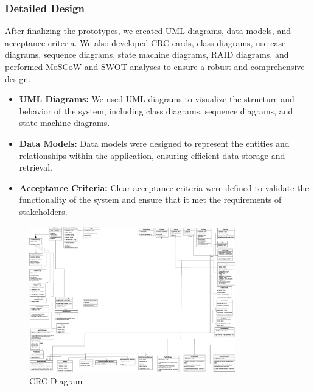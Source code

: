 \subsubsection{Detailed Design}
After finalizing the prototypes, we created UML diagrams, data models, and acceptance criteria. We also developed CRC cards, class diagrams, use case diagrams, sequence diagrams, state machine diagrams, RAID diagrams, and performed MoSCoW and SWOT analyses to ensure a robust and comprehensive design.

\begin{itemize}
  \item \textbf{UML Diagrams:} We used UML diagrams to visualize the structure and behavior of the system, including class diagrams, sequence diagrams, and state machine diagrams.
  
  \item \textbf{Data Models:} Data models were designed to represent the entities and relationships within the application, ensuring efficient data storage and retrieval.
  
  \item \textbf{Acceptance Criteria:} Clear acceptance criteria were defined to validate the functionality of the system and ensure that it met the requirements of stakeholders.
\end{itemize}

\begin{figure}[H]
    \centering
    \includegraphics[width=0.8\textwidth]{images/crc.png}
    \caption{CRC Diagram}
    \label{fig:example_icrcmage}
  \end{figure}


